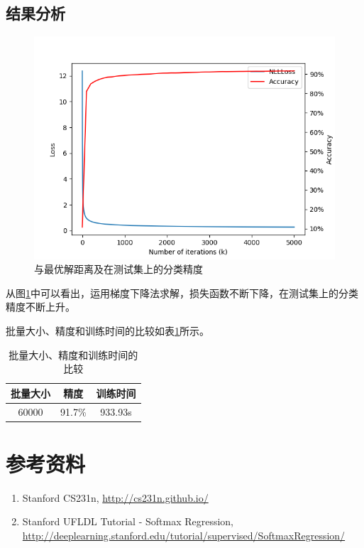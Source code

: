 \documentclass[logo,reportComp]{thesis}
\begin{document}
\subsection{结果分析}
\begin{figure}[H]
\centering
\includegraphics[width=0.6\linewidth]{fig/p2-acc.png}
\caption{与最优解距离及在测试集上的分类精度}
\label{fig:p2_result}
\end{figure}

从图\ref{fig:p2_result}中可以看出，运用梯度下降法求解，损失函数不断下降，在测试集上的分类精度不断上升。

批量大小、精度和训练时间的比较如表\ref{tab:minibatch}所示。

\begin{table}[H]
\caption{批量大小、精度和训练时间的比较}
\label{tab:minibatch}
\centering
\begin{tabular}{|c|c|c|}\hline
\textbf{批量大小} & \textbf{精度} & \textbf{训练时间}\\\hline
60000 & 91.7\% & 933.93s\\\hline
\end{tabular}
\end{table}

\section{参考资料}
\begin{enumerate}
	\item Stanford CS231n, \url{http://cs231n.github.io/}
	\item Stanford UFLDL Tutorial - Softmax Regression, \url{http://deeplearning.stanford.edu/tutorial/supervised/SoftmaxRegression/}
\end{enumerate}
\end{document}
